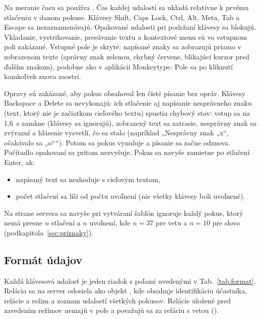 Na meranie času sa používa . Čas každej udalosti sa
ukladá relatívne k prvému stlačeniu v danom pokuse. Klávesy Shift, Caps Lock,
Ctrl, Alt, Meta, Tab a Escape sa nezaznamenávajú. Opakované udalosti pri
podržaní klávesy sa blokujú. Vkladanie, vystrihovanie, presúvanie textu
a kontextové menu sú vo vstupnom poli zakázané. Vstupné pole je skryté: napísané
znaky sa zobrazujú priamo v zobrazenom texte (správny znak zelenou, chybný
červene, blikajúci kurzor pred ďalším znakom), podobne ako v aplikácii
Monkeytype. Pole sa po kliknutí kamkoľvek znova zaostrí.

Opravy sú zakázané, aby pokus obsahoval len čisté písanie bez opráv.
Klávesy Backspace a Delete sa nevykonajú: ich stlačenie aj napísanie
nesprávneho znaku (text, ktorý nie je začiatkom cieľového textu) spustia
chybový stav: vstup sa na 1,6~s zamkne (klávesy sa ignorujú), zobrazený text
sa zatrasie, nesprávny znak sa zvýrazní a hlásenie vysvetlí, čo sa stalo
(napríklad „Nesprávny znak „x“, očakávalo sa „o““). Potom sa pokus vynuluje
a písanie sa začne odznova. Počítadlo opakovaní sa pritom nezvyšuje. Pokus sa navyše zamietne
po stlačení Enter, ak:
\begin{itemize}
  \item napísaný text sa nezhoduje s cieľovým textom,
  \item počet stlačení sa líši od počtu uvoľnení (nie všetky klávesy boli
        uvoľnené).
\end{itemize}
Na strane servera sa navyše pri vytváraní šablón ignoruje každý pokus,
ktorý nemá presne $n$ stlačení a $n$ uvoľnení, kde $n=37$ pre vetu a $n=10$
pre slovo (podkapitola~\ref{sec:priznaky}).

\subsection{Formát údajov}

Každá klávesová udalosť je jeden riadok s poľami uvedenými v
Tab.~\ref{tab:format}. Relácia sa na server odosiela ako objekt
, kde  obsahuje identifikáciu účastníka,
relácie a režim a  zoznam udalostí všetkých pokusov. Relácie
uložené pred zavedením režimov nemajú v  pole 
a považujú sa za reláciu s vetou ().

